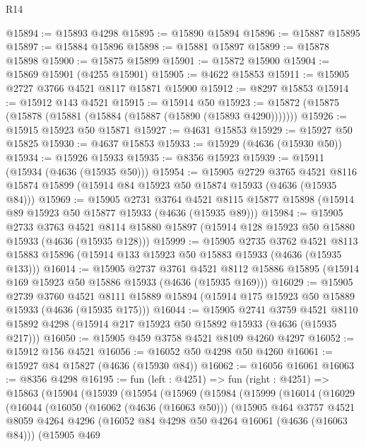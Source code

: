 \begin{lexlean}{R14}
\begin{coremodule}
@15894 := @15893 @4298
@15895 := @15890 @15894
@15896 := @15887 @15895
@15897 := @15884 @15896
@15898 := @15881 @15897
@15899 := @15878 @15898
@15900 := @15875 @15899
@15901 := @15872 @15900
@15904 := @15869 @15901 (@4255 @15901)
@15905 := @4622 @15853
@15911 := @15905 @2727 @3766 @4521 @8117 @15871 @15900
@15912 := @8297 @15853
@15914 := @15912 @143 @4521
@15915 := @15914 @50
@15923 := @15872 (@15875 (@15878 (@15881 (@15884 (@15887 (@15890 (@15893 @4290)))))))
@15926 := @15915 @15923 @50 @15871
@15927 := @4631 @15853
@15929 := @15927 @50 @15825
@15930 := @4637 @15853
@15933 := @15929 (@4636 (@15930 @50))
@15934 := @15926 @15933
@15935 := @8356 @15923
@15939 := @15911 (@15934 (@4636 (@15935 @50)))
@15954 := @15905
    @2729
    @3765
    @4521
    @8116
    @15874
    @15899
    (@15914 @84 @15923 @50 @15874 @15933 (@4636 (@15935 @84)))
@15969 := @15905
    @2731
    @3764
    @4521
    @8115
    @15877
    @15898
    (@15914 @89 @15923 @50 @15877 @15933 (@4636 (@15935 @89)))
@15984 := @15905
    @2733
    @3763
    @4521
    @8114
    @15880
    @15897
    (@15914 @128 @15923 @50 @15880 @15933 (@4636 (@15935 @128)))
@15999 := @15905
    @2735
    @3762
    @4521
    @8113
    @15883
    @15896
    (@15914 @133 @15923 @50 @15883 @15933 (@4636 (@15935 @133)))
@16014 := @15905
    @2737
    @3761
    @4521
    @8112
    @15886
    @15895
    (@15914 @169 @15923 @50 @15886 @15933 (@4636 (@15935 @169)))
@16029 := @15905
    @2739
    @3760
    @4521
    @8111
    @15889
    @15894
    (@15914 @175 @15923 @50 @15889 @15933 (@4636 (@15935 @175)))
@16044 := @15905
    @2741
    @3759
    @4521
    @8110
    @15892
    @4298
    (@15914 @217 @15923 @50 @15892 @15933 (@4636 (@15935 @217)))
@16050 := @15905 @459 @3758 @4521 @8109 @4260 @4297
@16052 := @15912 @156 @4521
@16056 := @16052 @50 @4298 @50 @4260
@16061 := @15927 @84 @15827 (@4636 (@15930 @84))
@16062 := @16056 @16061
@16063 := @8356 @4298
@16195 := fun (left : @4251) =>
  fun (right : @4251) =>
  @15863
    (@15904
      (@15939
        (@15954
          (@15969
            (@15984
              (@15999
                (@16014
                  (@16029
                    (@16044
                      (@16050
                        (@16062 (@4636 (@16063 @50)))
                        (@15905
                          @464
                          @3757
                          @4521
                          @8059
                          @4264
                          @4296
                          (@16052 @84 @4298 @50 @4264 @16061 (@4636 (@16063 @84)))
                          (@15905
                            @469

\end{coremodule}
\end{lexlean}
